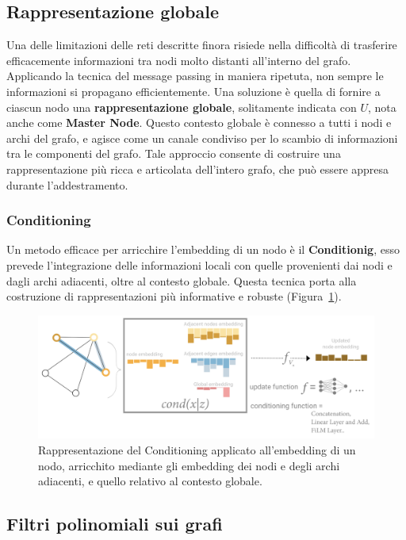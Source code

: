 \subsection{Rappresentazione globale}

Una delle limitazioni delle reti descritte finora risiede nella difficoltà di trasferire efficacemente informazioni tra nodi molto distanti all’interno del grafo. Applicando la tecnica del message passing in maniera ripetuta, non sempre le informazioni si propagano efficientemente. Una soluzione è quella di fornire a ciascun nodo una \textbf{rappresentazione globale}, solitamente indicata con $U$, nota anche come \textbf{Master Node}. Questo contesto globale è connesso a tutti i nodi e archi del grafo, e agisce come un canale condiviso per lo scambio di informazioni tra le componenti del grafo. Tale approccio consente di costruire una rappresentazione più ricca e articolata dell’intero grafo, che può essere appresa durante l’addestramento.

\subsubsection{Conditioning}

Un metodo efficace per arricchire l'embedding di un nodo è il \textbf{Conditionig}, esso prevede l'integrazione delle informazioni locali con quelle provenienti dai nodi e dagli archi adiacenti, oltre al contesto globale. Questa tecnica porta alla costruzione di rappresentazioni più informative e robuste (Figura~\ref{fig:condit}).

\begin{figure}
    \centering
    \includegraphics[width=\textwidth]{figure/Conditioning.png}
    \caption{Rappresentazione del Conditioning applicato all'embedding di un nodo, arricchito mediante gli embedding dei nodi e degli archi adiacenti, e quello relativo al contesto globale.}
    \label{fig:condit}
\end{figure}

\subsection{Filtri polinomiali sui grafi}

